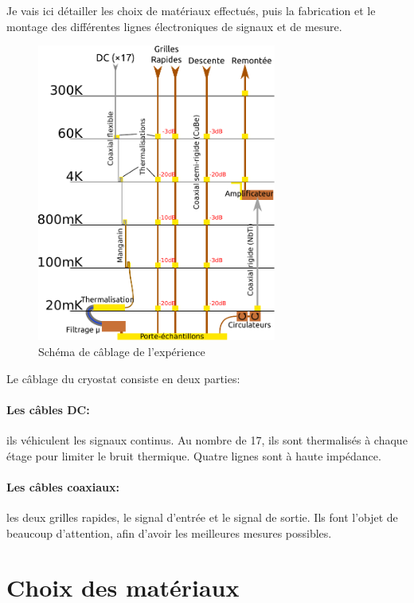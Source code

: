 Je vais ici détailler les choix de matériaux effectués, puis la fabrication et le montage des différentes lignes électroniques de signaux et de mesure.

\vspace*{0.2cm}
\begin{figure}[h]
    \begin{center}
        \includegraphics[width=0.7\textwidth]{Images/Cablage_schema}
        \caption{Schéma de câblage de l'expérience}
        \label{cablage_schema}
    \end{center}
\end{figure}


Le câblage du cryostat consiste en deux parties: 
\paragraph*{Les câbles DC: }ils véhiculent les signaux continus. Au nombre de 17, ils sont thermalisés à chaque étage pour limiter le bruit thermique. Quatre lignes sont à haute impédance.
\paragraph*{Les câbles coaxiaux: }les deux grilles rapides, le signal d'entrée et le signal de sortie. Ils font l'objet de beaucoup d'attention, afin d'avoir les meilleures mesures possibles.




\section{Choix des matériaux}

